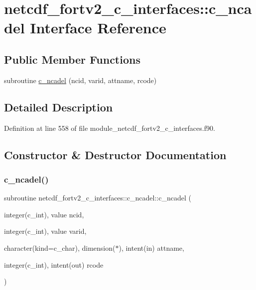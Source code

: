 \hypertarget{interfacenetcdf__fortv2__c__interfaces_1_1c__ncadel}{}\section{netcdf\+\_\+fortv2\+\_\+c\+\_\+interfaces\+:\+:c\+\_\+ncadel Interface Reference}
\label{interfacenetcdf__fortv2__c__interfaces_1_1c__ncadel}
\subsection*{Public Member Functions}
\begin{DoxyCompactItemize}
\item 
subroutine \hyperlink{interfacenetcdf__fortv2__c__interfaces_1_1c__ncadel_af84721cfac6c84a01758ecd576481a10}{c\+\_\+ncadel} (ncid, varid, attname, rcode)
\end{DoxyCompactItemize}


\subsection{Detailed Description}


Definition at line 558 of file module\+\_\+netcdf\+\_\+fortv2\+\_\+c\+\_\+interfaces.\+f90.



\subsection{Constructor \& Destructor Documentation}
\mbox{\label{interfacenetcdf__fortv2__c__interfaces_1_1c__ncadel_af84721cfac6c84a01758ecd576481a10}} 
\subsubsection{\texorpdfstring{c\+\_\+ncadel()}{c\_ncadel()}}
{\footnotesize\ttfamily subroutine netcdf\+\_\+fortv2\+\_\+c\+\_\+interfaces\+::c\+\_\+ncadel\+::c\+\_\+ncadel (\begin{DoxyParamCaption}\item[{integer(c\+\_\+int), value}]{ncid,  }\item[{integer(c\+\_\+int), value}]{varid,  }\item[{character(kind=c\+\_\+char), dimension($\ast$), intent(in)}]{attname,  }\item[{integer(c\+\_\+int), intent(out)}]{rcode }\end{DoxyParamCaption})}




